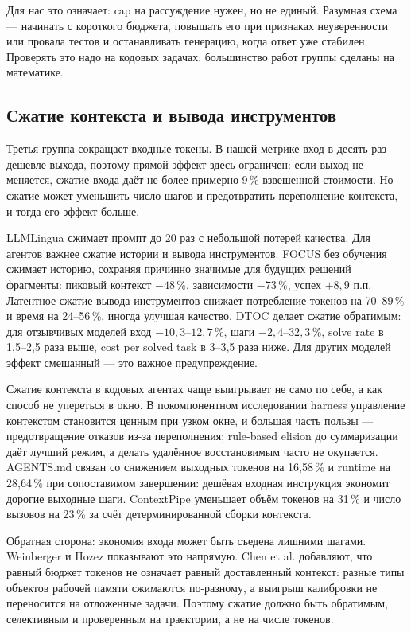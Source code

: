 \documentclass[11pt,a4paper]{article}
\begin{document}
Для нас это означает: cap на рассуждение нужен, но не единый. Разумная
схема — начинать с короткого бюджета, повышать его при признаках
неуверенности или провала тестов и останавливать генерацию, когда ответ уже
стабилен. Проверять это надо на кодовых задачах: большинство работ группы
сделаны на математике.

\subsection{Сжатие контекста и вывода инструментов}

Третья группа сокращает входные токены. В нашей метрике вход в десять раз
дешевле выхода, поэтому прямой эффект здесь ограничен: если выход не
меняется, сжатие входа даёт не более примерно 9\,\% взвешенной стоимости.
Но сжатие может уменьшить число шагов и предотвратить переполнение
контекста, и тогда его эффект больше.

LLMLingua \cite{jiang2023llmlinguacompressi} сжимает промпт до 20 раз с
небольшой потерей качества. Для агентов важнее сжатие истории и вывода
инструментов. FOCUS \cite{dixit2026focustraining} без обучения сжимает
историю, сохраняя причинно значимые для будущих решений фрагменты:
пиковый контекст $-48\,\%$, зависимости $-73\,\%$, успех $+8{,}9$ п.п.
Латентное сжатие вывода инструментов \cite{liu2026toolsneed} снижает
потребление токенов на 70--89\,\% и время на 24--56\,\%, иногда улучшая
качество. DTOC \cite{chaturvedi2026dtocdynamic} делает сжатие обратимым:
для отзывчивых моделей вход $-10{,}3$--$12{,}7\,\%$, шаги $-2{,}4$--$32{,}3\,\%$,
solve rate в 1{,}5--2{,}5 раза выше, cost per solved task в 3--3{,}5 раза
ниже. Для других моделей эффект смешанный — это важное предупреждение.

Сжатие контекста в кодовых агентах чаще выигрывает не само по себе, а как
способ не упереться в окно. В покомпонентном исследовании harness
\cite{fan2026empiricalstudy} управление контекстом становится ценным при
узком окне, и большая часть пользы — предотвращение отказов из-за
переполнения; rule-based elision до суммаризации даёт лучший режим, а
делать удалённое восстановимым часто не окупается. AGENTS.md
\cite{lulla2026impactagents} связан со снижением выходных токенов на
16{,}58\,\% и runtime на 28{,}64\,\% при сопоставимом завершении: дешёвая
входная инструкция экономит дорогие выходные шаги. ContextPipe
\cite{xu2026contextpipedatabas} уменьшает объём токенов на 31\,\% и число
вызовов на 23\,\% за счёт детерминированной сборки контекста.

Обратная сторона: экономия входа может быть съедена лишними шагами.
Weinberger и Hozez \cite{weinberger2026tokenreduction} показывают это
напрямую. Chen et al. \cite{chen2026measurebefore} добавляют, что равный
бюджет токенов не означает равный доставленный контекст: разные типы
объектов рабочей памяти сжимаются по-разному, а выигрыш калибровки не
переносится на отложенные задачи. Поэтому сжатие должно быть обратимым,
селективным и проверенным на траектории, а не на числе токенов.
\end{document}

